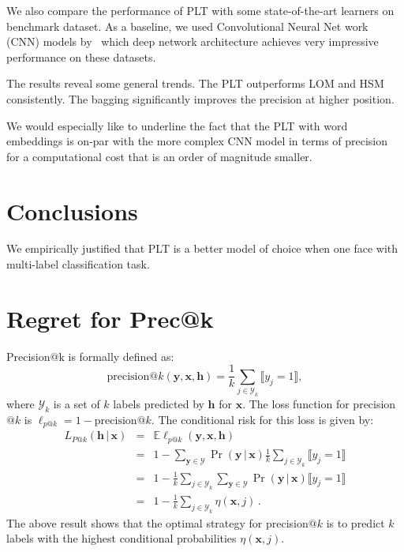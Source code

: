 \documentclass{article}
\newcommand{\Algo}[1]{\textsc{#1}}
\renewcommand{\vec}[1]{\boldsymbol{#1}}
\newcommand{\bx}{\vec{x}}
\newcommand{\by}{\vec{y}}
\newcommand{\bh}{\vec{h}}
\newcommand{\calY}{\mathcal{Y}}
\newcommand{\loss}{L}
\newcommand{\assert}[1]{\llbracket #1 \rrbracket}
\newcommand{\given}{\, | \,}
\begin{document}
We also compare the performance of \Algo{PLT} with some state-of-the-art learners on benchmark dataset. As a baseline, we used Convolutional Neural Net work (CNN) models by~\citep{Liu_et_al_2017} which deep network architecture achieves very impressive  performance on these datasets.

The results reveal some general trends. The PLT outperforms LOM and HSM consistently. The bagging significantly improves the precision at higher position. 

We would especially like to underline the fact that the PLT with word embeddings is on-par with the more complex CNN model in terms of precision for a computational cost that is an order of magnitude smaller.


\section{Conclusions}

We empirically justified that \Algo{PLT} is a better model of choice when one face with multi-label classification task.

\newpage






\appendix

\onecolumn

\section{Regret for Prec@k}


Precision@k is formally defined as:
\begin{equation}
\mathrm{precision}@k(\by, \bx, \bh) = \frac{1}{k} \sum_{j \in \calY_k} \assert{y_j = 1},
\label{eqn:precision-at-k}
\end{equation}
where $\calY_k$ is a set of $k$ labels predicted by $\bh$ for $\bx$.
%
The loss function for precision$@k$ is $\ell_{p@k} = 1 - \mathrm{precision}@k$. The conditional risk for this loss is given by:
\begin{eqnarray*}
\loss_{P@k}(\bh \given \bx) & = & \mathbb{E} \ell_{p@k}(\by,\bx, \bh) \\
& = & 1 - \sum_{\by \in \calY} \Pr(\by \given \bx) \frac{1}{k} \sum_{j \in \calY_k} \assert{y_j = 1} \\
& = & 1 - \frac{1}{k} \sum_{j \in \calY_k} \sum_{\by \in \calY} \Pr(\by \given \bx) \assert{y_j = 1} \\
& = & 1 - \frac{1}{k} \sum_{j \in \calY_k} \eta(\bx,j) \,.
\end{eqnarray*}
%
The above result shows that the optimal strategy for precision$@k$ is to predict $k$ labels
with the highest conditional probabilities $\eta(\bx,j)$.
\end{document}

